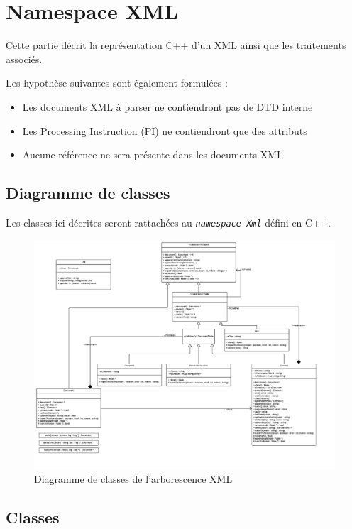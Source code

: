 \chapter{Namespace XML}

Cette partie décrit la représentation C++ d'un XML ainsi que les traitements associés.

Les hypothèse suivantes sont également formulées :
\begin{itemize}
    \item Les documents XML à parser ne contiendront pas de DTD interne
    \item Les Processing Instruction (PI) ne contiendront que des attributs
    \item Aucune référence ne sera présente dans les documents XML\\
\end{itemize}


\section{Diagramme de classes}
    Les classes ici décrites seront rattachées au \textit{\lstinline$namespace Xml$} défini en C++.

    \begin{landscape}
    \begin{figure}[h!]
        \centering
        \includegraphics[width=0.9\linewidth]{images/xml-uml.pdf}
        \caption{Diagramme de classes de l'arborescence XML}
        \label{classDiagram}
    \end{figure}
    \end{landscape}


\section{Classes}
